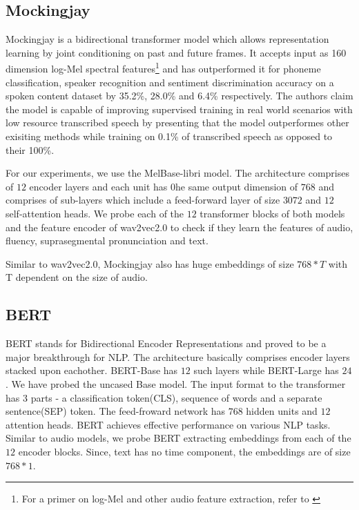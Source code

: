 \documentclass[sigconf]{acmart}
\newcommand{\wv}{wav2vec2.0\xspace}
\newcommand{\mj}{Mockingjay\xspace}
\begin{document}
\subsection{Mockingjay}
\label{sec:mockingjay}
{\mj} is a bidirectional transformer model which allows representation learning by joint conditioning on past and future frames. It accepts input as 160 dimension log-Mel spectral features\footnote{For a primer on log-Mel and other audio feature extraction, refer to \cite{choi2017tutorial}} and has outperformed it for phoneme classification, speaker recognition and sentiment discrimination accuracy on a spoken content dataset by  35.2\%, 28.0\% and 6.4\% respectively. The authors claim the model is capable of improving supervised training in real world scenarios with low resource transcribed speech by presenting that the model outperformes other exisiting methods while training on 0.1\% of transcribed speech as opposed to their 100\%.

For our experiments, we use the MelBase-libri model. The architecture comprises of $12$ encoder layers and each unit has 0he same output dimension of $768$ and comprises of sub-layers which include a feed-forward layer of size $3072$ and $12$ self-attention heads.  We probe each of the $12$ transformer blocks of both models and the feature encoder of wav2vec2.0 to check if they learn the features of audio, fluency, suprasegmental pronunciation and text.

Similar to {\wv}, {\mj} also has huge embeddings of size $768*T$ with T dependent on the size of audio.
\subsection{BERT}
\label{sec:BERT}
BERT stands for Bidirectional Encoder Representations and proved to be a major breakthrough for NLP. The architecture basically comprises encoder layers stacked upon eachother. BERT-Base has $12$ such layers while BERT-Large has $24$. We have probed the uncased Base model. The input format to the transformer has $3$ parts - a classification token(CLS), sequence of words and a separate sentence(SEP) token. The feed-froward network has $768$ hidden units and $12$ attention heads. BERT achieves effective performance on various NLP tasks. Similar to audio models, we probe BERT extracting embeddings from each of the $12$ encoder blocks. Since, text has no time component, the embeddings are of size $768*1$.
\end{document}
